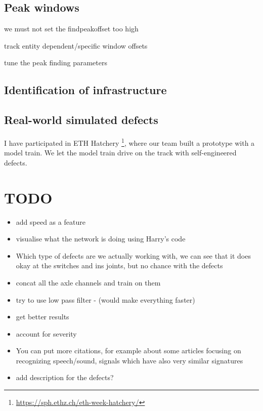 \subsection{Peak windows}
we must not set the findpeakoffset too high

track entity dependent/specific window offsets

tune the peak finding parameters

\subsection{Identification of infrastructure}
	
\subsection{Real-world simulated defects}
I have participated in ETH Hatchery \footnote{\url{https://sph.ethz.ch/eth-week-hatchery/}}, where our team built a prototype with a model train. We let the model train drive on the track with self-engineered defects. 


\newpage
\section{TODO}
\begin{itemize}
	\item add speed as a feature
	\item visualise what the network is doing using Harry's code
	\item Which type of defects are we actually working with, we can see that it does okay at the switches and ins joints, but no chance with the defects
	\item concat all the axle channels and train on them
	\item try to use low pass filter - (would make everything faster)
	\item get better results
	\item account for severity
	\item You can put more citations, for example about some articles focusing on recognizing speech/sound, signals which have also very similar signatures
	\item add description for the defects?
\end{itemize}

